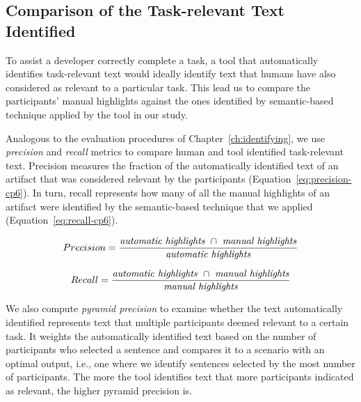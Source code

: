 
\subsection{Comparison of the Task-relevant Text Identified}
\label{cp6:comparison}


To assist a developer correctly complete a task, a tool that
automatically identifies task-relevant text would ideally 
identify text that humans have also considered as relevant to a particular task. 
This lead us to compare the participants' manual highlights against the ones 
identified by semantic-based technique applied by the tool in our study.
 



Analogous to the evaluation procedures of Chapter~\ref{ch:identifying}, we use 
\textit{precision} and \textit{recall} metrics
to compare human and tool identified task-relevant text.
Precision measures the fraction of the automatically identified text of an artifact that was  considered relevant
by the participants (Equation~\ref{eq:precision-cp6}). 
In turn, recall represents how many of all the manual highlights of an artifact were identified by the semantic-based technique that we applied (Equation~\ref{eq:recall-cp6}). 

\smallskip
\begin{small}


\begin{equation}
    Precision = \frac{
        \text{\textit{automatic highlights}~} \cap 
        \text{~\textit{manual highlights}}
    }{\text{\textit{automatic highlights}}}
\label{eq:precision-cp6}    
\end{equation}
\end{small}


\begin{small}
\begin{equation}
    Recall = \frac{
        \text{\textit{automatic highlights}~} \cap 
        \text{~\textit{manual highlights}}
    }{\text{\textit{manual highlights}}}
\label{eq:recall-cp6}    
\end{equation}
\end{small}

\medskip


We also compute \textit{pyramid precision} to examine whether the text automatically identified represents text that multiple participants deemed relevant to a certain task.
It weights the automatically identified text based on the number of participants who selected a sentence and compares it to a scenario with an optimal output, i.e., one where we identify sentences selected by the most number of participants.   
The more the tool identifies text that more participants indicated as relevant, the higher pyramid precision is.

